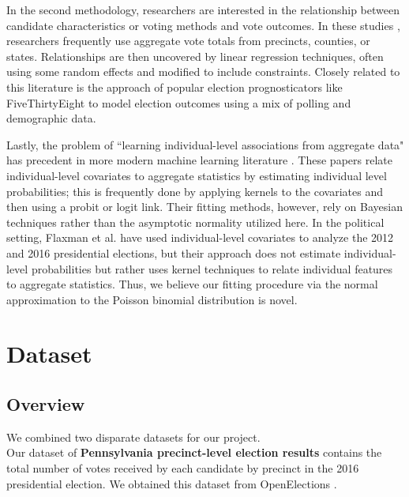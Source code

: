 \documentclass[10pt,twocolumn,letterpaper]{article}
\begin{document}
In the second methodology, researchers are interested in the relationship between candidate characteristics or voting methods and vote outcomes. In these studies \cite{miller1998impact, frisina2008ballot, 10.2307/24371899}, researchers frequently use aggregate vote totals from precincts, counties, or states. Relationships are then uncovered by linear regression techniques, often using some random effects \cite{10.2307/2585758} and modified to include constraints. Closely related to this literature is the approach of popular election prognosticators like FiveThirtyEight \cite{538} to model election outcomes using a mix of polling and demographic data. 

Lastly, the problem of ``learning individual-level associations from aggregate data" \cite{flaxman2015supported} has precedent in more modern machine learning literature \cite{patrini2014almost, kuck2012learning, sun2015message, quadrianto2009estimating}. These papers relate individual-level covariates to aggregate statistics by estimating individual level probabilities; this is frequently done by applying kernels to the covariates and then using a probit or logit link. Their fitting methods, however, rely on Bayesian techniques rather than the asymptotic normality utilized here. In the political setting, Flaxman et al. have used individual-level covariates to analyze the 2012 \cite{flaxman2015supported} and 2016 \cite{flaxman2016understanding} presidential elections, but their approach does not estimate individual-level probabilities but rather uses kernel techniques to relate individual features to aggregate statistics. Thus, we believe our fitting procedure via the normal approximation to the Poisson binomial distribution is novel.

\section{Dataset}

\subsection{Overview}

We combined two disparate datasets for our project. \\

Our dataset of \textbf{Pennsylvania precinct-level election results} contains the total number of votes received by each candidate by precinct in the 2016 presidential election. We obtained this dataset from OpenElections \cite{OpenElections}.
\end{document}
